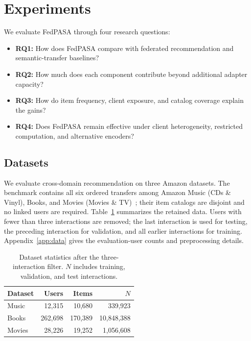 \section{Experiments}
\label{sec:exp}
We evaluate FedPASA through four research questions:
\begin{itemize}
\setlength{\itemsep}{0pt}
\setlength{\parskip}{0pt}
\item \textbf{RQ1:} How does FedPASA compare with federated recommendation and semantic-transfer baselines?
\item \textbf{RQ2:} How much does each component contribute beyond additional adapter capacity?
\item \textbf{RQ3:} How do item frequency, client exposure, and catalog coverage explain the gains?
\item \textbf{RQ4:} Does FedPASA remain effective under client heterogeneity, restricted computation, and alternative encoders?
\end{itemize}

\subsection{Datasets}
We evaluate cross-domain recommendation on three Amazon datasets. The benchmark contains all six ordered transfers among Amazon Music (CDs \& Vinyl), Books, and Movies (Movies \& TV)~\citep{ni2019justifying}; their item catalogs are disjoint and no linked users are required. Table~\ref{tab:datasets-main} summarizes the retained data. Users with fewer than three interactions are removed; the last interaction is used for testing, the preceding interaction for validation, and all earlier interactions for training. Appendix~\ref{app:data} gives the evaluation-user counts and preprocessing details.

\begin{table}[t]
\centering\footnotesize
\caption{Dataset statistics after the three-interaction filter. $N$ includes training, validation, and test interactions.}
\label{tab:datasets-main}
\setlength{\tabcolsep}{3.2pt}
\renewcommand{\arraystretch}{1.05}
\begin{tabular}{@{}lrrr@{}}
\toprule
Dataset & Users & Items & $N$ \\
\midrule
Music & 12,315 & 10,680 & 339,923 \\
Books & 262,698 & 170,389 & 10,848,388 \\
Movies & 28,226 & 19,252 & 1,056,608 \\
\bottomrule
\end{tabular}
\end{table}

